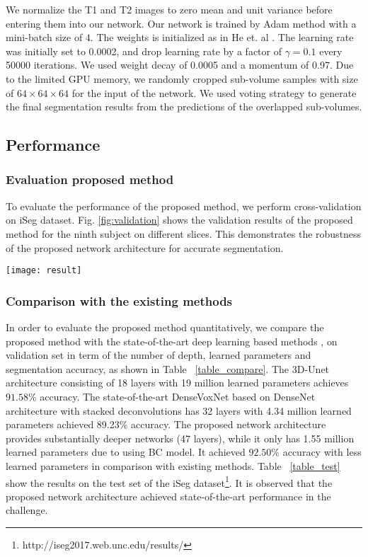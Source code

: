 \documentclass{llncs}
\begin{document}
 We normalize the T1 and T2 images to zero mean and unit variance before entering them into our network. Our network is trained by Adam method \cite{kingma2014adam} with a mini-batch size of $4$. The weights is initialized as in He et. al \cite{he2015delving}. The learning rate was initially set to 0.0002, and drop learning rate by a factor of $\gamma=0.1$ every 50000 iterations. We used weight decay of 0.0005 and a momentum of 0.97. Due to the limited GPU memory, we randomly cropped sub-volume samples with size of $64\times 64 \times 64$ for the input of the network. We used voting strategy to generate the final segmentation results from the predictions of the overlapped sub-volumes. 
\subsection{Performance}
\subsubsection{Evaluation proposed method} To evaluate the performance of the proposed method, we perform cross-validation on iSeg dataset. Fig. \ref{fig:validation} shows the validation results of the proposed method for the ninth subject on different slices. This demonstrates the robustness of the proposed network architecture for accurate segmentation. 
\begin{figure*}[ht]
   \centering
    \texttt{[image: result]}%
\caption{Segmentation result on different slice (a) T1 image, (b) T2 image, (c) DenseVoxNet, (d) our result, (e) manual segmentation}
   \label{fig:validation}%
\end{figure*}
\subsubsection{Comparison with the existing methods} In order to evaluate the proposed method quantitatively, we compare the proposed method with the state-of-the-art deep learning based methods \cite{cciccek20163d},  \cite{yu2017automatic} on validation set in term of the number of depth, learned parameters and segmentation accuracy, as shown in Table ~\ref{table_compare}. The 3D-Unet \cite{cciccek20163d} architecture consisting of 18 layers with 19 million learned parameters achieves $91.58$\% accuracy. The state-of-the-art DenseVoxNet \cite{yu2017automatic} based on DenseNet architecture with stacked deconvolutions has 32 layers with 4.34 million learned parameters achieved 89.23\% accuracy. The proposed network architecture provides substantially deeper networks (47 layers), while it only has 1.55 million learned parameters due to using BC model. It achieved $92.50\%$ accuracy with less learned parameters in comparison with existing methods. Table ~\ref{table_test} show the results on the test set of the iSeg dataset\footnote{http://iseg2017.web.unc.edu/results/}. It is observed that the proposed network architecture achieved state-of-the-art performance in the challenge.
\end{document}
